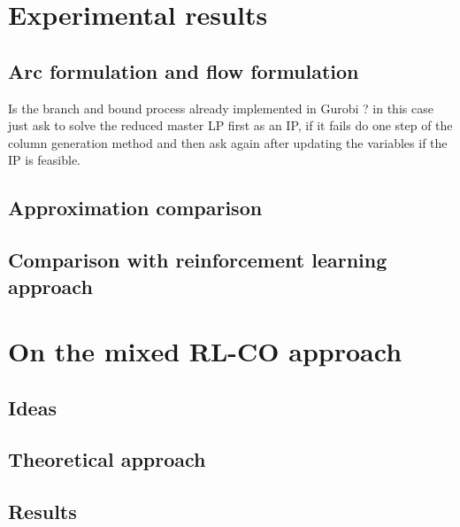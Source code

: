 \documentclass[14pt,a4paper]{article}
\theoremstyle{definition}
\numberwithin{equation}{subsection}
\begin{document}
\newpage
\section{Experimental results}
\label{results}
\subsection{Arc formulation and flow formulation}
\label{results:arcsVSflow}

Is the branch and bound process already implemented in Gurobi ? in this case just ask to solve the reduced master LP first as an IP, if it fails do one step of the column generation method and then ask again after updating the variables if the IP is feasible.

\subsection{Approximation comparison}
\subsection{Comparison with reinforcement learning approach}


\newpage
\section{On the mixed RL-CO approach}
\subsection{Ideas}
\subsection{Theoretical approach}
\subsection{Results}

\newpage

 \nocite{*} 



\end{document}
